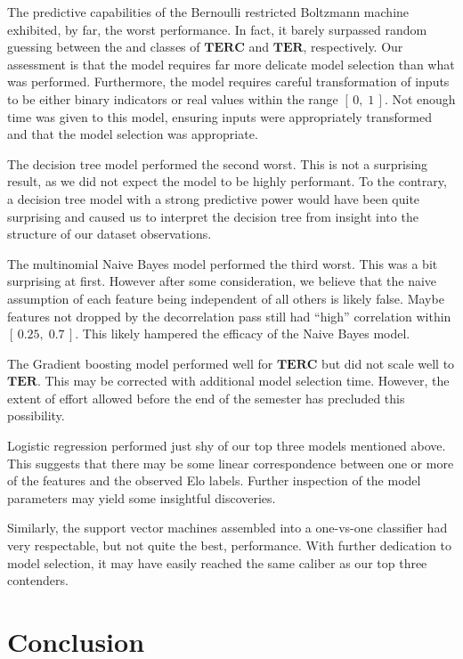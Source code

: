 \documentclass{article}
\newcommand{\Qty}[1]{\oldstylenums{#1}}
\newcommand{\TER}{\ensuremath{\mathbf{TER}}\xspace}
\newcommand{\TERC}{\ensuremath{\mathbf{TERC}}\xspace}
\newcommand{\NumericRange}[2]{\ensuremath{\left[\,#1,\; #2\,\right]}\xspace}
\begin{document}
The predictive capabilities of the Bernoulli restricted Boltzmann machine exhibited, by far, the worst performance.
In fact, it barely surpassed random guessing between the \Qty{12} and \Qty{22} classes of \TERC and \TER, respectively.
Our assessment is that the model requires far more delicate model selection than what was performed.
Furthermore, the model requires careful transformation of inputs to be either binary indicators or real values within the range \NumericRange{0}{1}.
Not enough time was given to this model, ensuring inputs were appropriately transformed and that the model selection was appropriate.
 
The decision tree model performed the second worst.
This is not a surprising result, as we did not expect the model to be highly performant.
To the contrary, a decision tree model with a strong predictive power would have been quite surprising and caused us to interpret the decision tree from insight into the structure of our dataset observations.

The multinomial Naive Bayes model performed the third worst.
This was a bit surprising at first.
However after some consideration, we believe that the naive assumption of each feature being independent of all others is likely false.
Maybe features not dropped by the decorrelation pass still had ``high'' correlation within \NumericRange{0.25}{0.7}.
This likely hampered the efficacy of the Naive Bayes model.

The Gradient boosting model performed well for \TERC but did not scale well to \TER.
This may be corrected with additional model selection time.
However, the extent of effort allowed before the end of the semester has precluded this possibility.

Logistic regression performed just shy of our top three models mentioned above.
This suggests that there may be some linear correspondence between one or more of the features and the observed Elo labels.
Further inspection of the model parameters may yield some insightful discoveries.

Similarly, the support vector machines assembled into a one-vs-one classifier had very respectable, but not quite the best, performance.
With further dedication to model selection, it may have easily reached the same caliber as our top three contenders.


\hypertarget{conclusion}{%
\section{Conclusion}}
\end{document}
